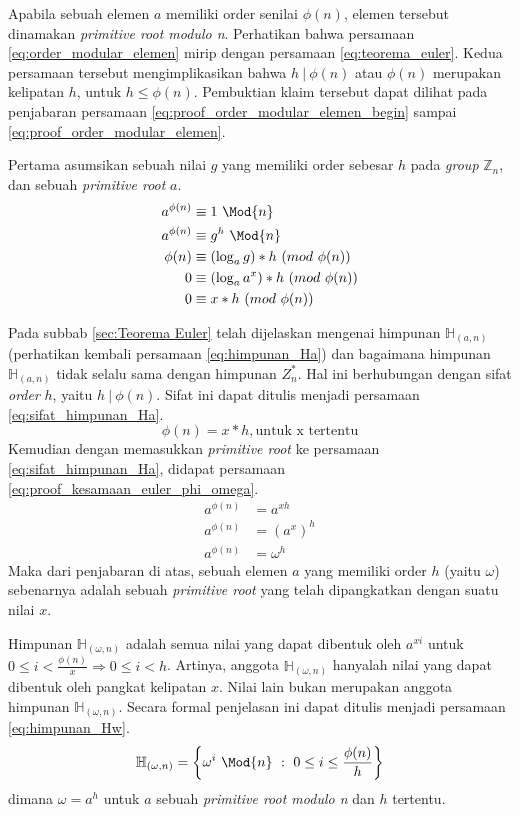 Apabila sebuah elemen $ a $ memiliki order senilai $ \phi(n) $, elemen tersebut dinamakan \textit{primitive root modulo n}.
Perhatikan bahwa persamaan \eqref{eq:order_modular_elemen} mirip dengan persamaan \eqref{eq:teorema_euler}. Kedua persamaan tersebut mengimplikasikan bahwa $ h\ |\ \phi(n) $ atau $ \phi(n) $ merupakan kelipatan $ h $, untuk $ h\leq \phi(n) $. Pembuktian klaim tersebut dapat dilihat pada penjabaran persamaan \eqref{eq:proof_order_modular_elemen_begin} sampai \eqref{eq:proof_order_modular_elemen}.

Pertama asumsikan sebuah nilai $ g $ yang memiliki order sebesar $ h $ pada \textit{group} $ \mathbb{Z}_n $, dan sebuah \textit{primitive root} $ a $.
\begin{align}
\label{eq:proof_order_modular_elemen_begin}
a^{\phi(n)} &\equiv 1\ \Mod{n}	\\
a^{\phi(n)} &\equiv g^h\ \Mod{n} \\
\phi(n) &\equiv (\log_a g) * h\ (mod\ \phi(n)) \\
0 &\equiv (\log_a {a^x}) * h\ (mod\ \phi(n)) \\
0 &\equiv x * h\ (mod\ \phi(n))
\label{eq:proof_order_modular_elemen}
\end{align}

Pada subbab \ref{sec:Teorema Euler} telah dijelaskan mengenai himpunan $ \mathbb{H}_{(a, n)} $ (perhatikan kembali persamaan \eqref{eq:himpunan_Ha}) dan bagaimana himpunan $ \mathbb{H}_{(a, n)} $ tidak selalu sama dengan himpunan $ Z_n^* $. Hal ini berhubungan dengan sifat \textit{order} $ h $, yaitu $ h\ |\ \phi(n) $. Sifat ini dapat ditulis menjadi persamaan \eqref{eq:sifat_himpunan_Ha}.
\begin{equation}
\phi(n)=x*h,\text{untuk x tertentu}
\label{eq:sifat_himpunan_Ha}
\end{equation}
Kemudian dengan memasukkan \textit{primitive root} ke persamaan \eqref{eq:sifat_himpunan_Ha}, didapat persamaan \eqref{eq:proof_kesamaan_euler_phi_omega}.
\begin{align}
a^{\phi(n)} &=a^{xh} \\
a^{\phi(n)} &=(a^x)^h \\
a^{\phi(n)} &=\omega^h
\label{eq:proof_kesamaan_euler_phi_omega}
\end{align}
Maka dari penjabaran di atas, sebuah elemen $ a $ yang memiliki order $ h $ (yaitu $\omega$) sebenarnya adalah sebuah \textit{primitive root} yang telah dipangkatkan dengan suatu nilai $ x $.\hfill\eop

Himpunan $ \mathbb{H}_{(\omega, n)} $ adalah semua nilai yang dapat dibentuk oleh $ a^{xi} $ untuk $ 0\leq i < \frac{\phi(n)}{x} \Rightarrow 0\leq i < h $. Artinya, anggota $ \mathbb{H}_{(\omega, n)} $ hanyalah nilai yang dapat dibentuk oleh pangkat kelipatan $ x $. Nilai lain bukan merupakan anggota himpunan $ \mathbb{H}_{(\omega, n)} $. Secara formal penjelasan ini dapat ditulis menjadi persamaan \eqref{eq:himpunan_Hw}.
\begin{equation}
\mathbb{H}_{(\omega,n)}=\left\{\omega^i\ \Mod{n}\ :\ 0 \leq i \leq \frac{\phi(n)}{h}\right\}
\label{eq:himpunan_Hw}
\end{equation}
dimana $ \omega=a^h $ untuk $ a $ sebuah \textit{primitive root modulo n} dan $ h $ tertentu.

